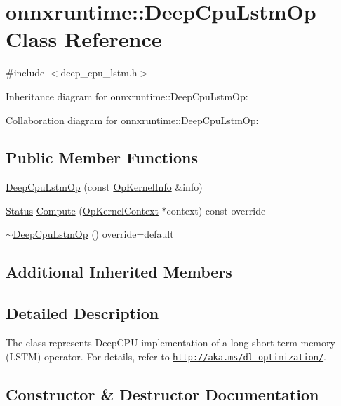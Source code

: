 \hypertarget{classonnxruntime_1_1DeepCpuLstmOp}{}\section{onnxruntime\+:\+:Deep\+Cpu\+Lstm\+Op Class Reference}
\label{classonnxruntime_1_1DeepCpuLstmOp}


{\ttfamily \#include $<$deep\+\_\+cpu\+\_\+lstm.\+h$>$}



Inheritance diagram for onnxruntime\+:\+:Deep\+Cpu\+Lstm\+Op\+:


Collaboration diagram for onnxruntime\+:\+:Deep\+Cpu\+Lstm\+Op\+:
\subsection*{Public Member Functions}
\begin{DoxyCompactItemize}
\item 
\mbox{\hyperlink{classonnxruntime_1_1DeepCpuLstmOp_a70e2f8ed98afe51a12876536cb5d1986}{Deep\+Cpu\+Lstm\+Op}} (const \mbox{\hyperlink{classonnxruntime_1_1OpKernelInfo}{Op\+Kernel\+Info}} \&info)
\item 
\mbox{\hyperlink{classonnxruntime_1_1common_1_1Status}{Status}} \mbox{\hyperlink{classonnxruntime_1_1DeepCpuLstmOp_a65ed186dc993041c05ce342285b5512f}{Compute}} (\mbox{\hyperlink{classonnxruntime_1_1OpKernelContext}{Op\+Kernel\+Context}} $\ast$context) const override
\item 
\mbox{\hyperlink{classonnxruntime_1_1DeepCpuLstmOp_a2253c540870ab432144c98fd3250edec}{$\sim$\+Deep\+Cpu\+Lstm\+Op}} () override=default
\end{DoxyCompactItemize}
\subsection*{Additional Inherited Members}


\subsection{Detailed Description}
The class represents Deep\+C\+PU implementation of a long short term memory (L\+S\+TM) operator. For details, refer to \href{http://aka.ms/dl-optimization/}{\tt http\+://aka.\+ms/dl-\/optimization/}. 

\subsection{Constructor \& Destructor Documentation}
\mbox{\label{classonnxruntime_1_1DeepCpuLstmOp_a70e2f8ed98afe51a12876536cb5d1986}} 
